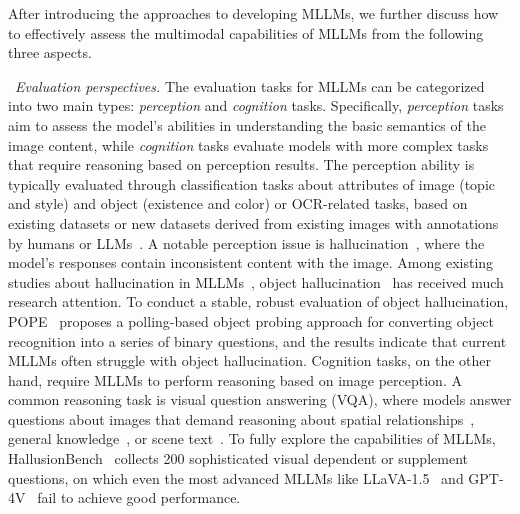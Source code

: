 { {After introducing the approaches to developing MLLMs, we further discuss how to effectively assess the multimodal capabilities of MLLMs from the following three aspects.  
}

\textbullet~\emph{Evaluation perspectives.} 
{The evaluation tasks for MLLMs can be categorized into two main types: \emph{perception} and \emph{cognition} tasks. Specifically, \emph{perception} tasks aim to assess the model's abilities in understanding the basic semantics of the image content, while \emph{cognition} tasks evaluate models with more complex tasks that require reasoning based on perception results. 
The perception ability is typically evaluated through classification tasks about attributes of image (\eg topic and style) and object (\eg existence and color) or OCR-related tasks, based on existing datasets or new datasets derived from existing images with annotations by humans or LLMs~\cite{Gurari-cvpr-2018-vizwiz, Mishra-cvpr-2012-top, Liu-arxiv-2023-mmbench, Fu-arxiv-2023-mme}. 
A notable perception issue is hallucination~\cite{Zhang-arxiv-2023-siren}, where the model's responses contain inconsistent content with the image. 
Among existing studies about hallucination in MLLMs~\cite{liu-arxiv-2023-aligning, Gunjal-arxiv-2023-detecting, Lu-arxiv-2023-evaluation}, object hallucination~\cite{Rohrbach-emnlp-2018-object} has received much research attention.  
To conduct a stable, robust evaluation of object hallucination, POPE~\cite{Li-emnlp-2023-evaluating} proposes a polling-based object probing approach for converting object recognition into a series of binary questions, and the results indicate that current MLLMs often struggle with object hallucination.
Cognition tasks, on the other hand, require MLLMs to perform reasoning based on image perception. A common reasoning task is visual question answering (VQA), where models answer questions about images that demand reasoning about spatial relationships~\cite{Hudson-cvpr-2019-gqa}, general knowledge~\cite{Lu-nips-2022-learn}, or scene text~\cite{Amanpreet-cvpr-2019-textvqa}. To fully explore the capabilities of MLLMs, HallusionBench~\cite{Liu-arxiv-2023-hallusionbench} collects 200 sophisticated visual dependent or supplement questions, on which even the most advanced MLLMs like LLaVA-1.5~\cite{Liu-arxiv-2023-improved} and GPT-4V~\cite{OpenAI-OpenAI-2023-GPT-4v} fail to achieve good performance.}

}
